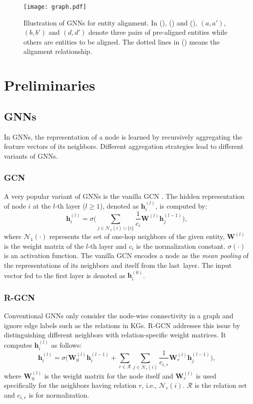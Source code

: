 \documentclass[letterpaper]{article} \usepackage{aaai20}  \usepackage{times}  \usepackage{helvet} \usepackage{courier}  \usepackage[hyphens]{url}  \usepackage{graphicx} \urlstyle{rm} \def\UrlFont{\rm}  \frenchspacing  \setlength{\pdfpagewidth}{8.5in}  \setlength{\pdfpageheight}{11in}  \usepackage{amsmath}
\begin{document}
\begin{figure*}[!t]
	\center
	\texttt{[image: graph.pdf]}
	\caption{Illustration of GNNs for entity alignment. In (), () and (), $(a, a')$, $(b, b')$ and $(d, d')$ denote three pairs of pre-aligned entities while others are entities to be aligned. The dotted lines in () means the alignment relationship.}
	\label{fig:graph}
\end{figure*}

\section{Preliminaries}
\label{sect:preli}
\subsection{GNNs}
In GNNs, the representation of a node is learned by recursively aggregating the feature vectors of its neighbors. Different aggregation strategies lead to different variants of GNNs. 
\subsubsection{GCN} A very popular variant of GNNs is the vanilla GCN \cite{GCN}. The hidden representation of node $i$ at the $l$-th layer ($l\geq 1$), denoted as $\mathbf{h}_i^{(l)}$, is computed by: 
\begin{equation} 
	\label{eq:gcn}
	\mathbf{h}_i^{(l)} = \sigma \Big (\sum_{j\in \mathcal{N}_1(i)\cup \{i\} } \frac{1}{c_i} \mathbf{W}^{(l)} \mathbf{h}_j^{(l-1)} \Big ),
\end{equation}
where $\mathcal{N}_1(\cdot)$ represents the set of one-hop neighbors of the given entity, $\mathbf{W}^{(l)}$ is the weight matrix of the $l$-th layer and $c_i$ is the normalization constant. $\sigma(\cdot)$ is an activation function. The vanilla GCN encodes a node as the \textit{mean pooling} of the representations of its neighbors and itself from the last~layer. The input vector fed to the first layer is denoted as $\mathbf{h}_i^{(0)}$.

\subsubsection{R-GCN} Conventional GNNs only consider the node-wise connectivity in a graph and ignore edge labels such as the relations in KGs. R-GCN \cite{R-GCN} addresses this issue by distinguishing different neighbors with relation-specific weight matrices. It computes $\mathbf{h}_i^{(l)}$ as follows: 
\begin{equation} 
\label{eq:rrgcn}
\mathbf{h}_i^{(l)} = \sigma \Big (\mathbf{W}_0^{(l)}\mathbf{h}_i^{(l-1)} + \sum_{r\in \mathcal{R}}\sum_{j\in \mathcal{N}_r(i)} \frac{1}{c_{i,r}} \mathbf{W}_r^{(l)} \mathbf{h}_j^{(l-1)} \Big ),
\end{equation}
where $\mathbf{W}_0^{(l)}$ is the weight matrix for the node itself and $\mathbf{W}_r^{(l)} $ is used specifically for the neighbors having relation $r$, i.e., $\mathcal{N}_r(i)$. $\mathcal{R}$ is the relation set and $c_{i,r}$ is for normalization. 
\end{document}
